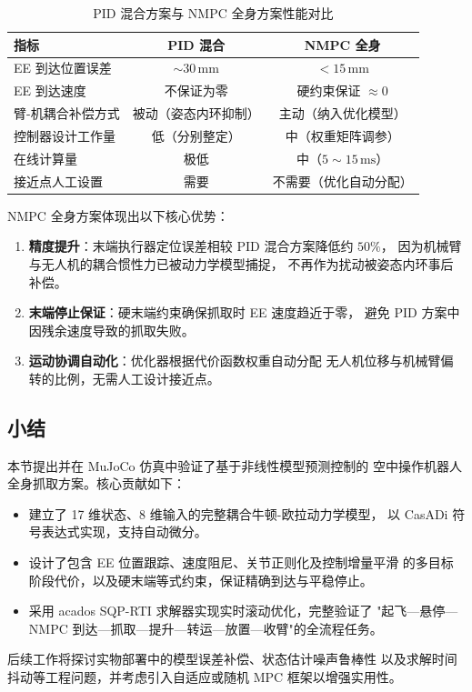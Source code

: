 \begin{table}[h]
\centering
\caption{PID 混合方案与 NMPC 全身方案性能对比}
\label{tab:pid_vs_mpc}
\begin{tabular}{lcc}
\hline
\textbf{指标} & \textbf{PID 混合} & \textbf{NMPC 全身} \\
\hline
EE 到达位置误差         & $\sim\!30\,\mathrm{mm}$       & $<15\,\mathrm{mm}$ \\
EE 到达速度             & 不保证为零                    & 硬约束保证 $\approx 0$ \\
臂-机耦合补偿方式       & 被动（姿态内环抑制）           & 主动（纳入优化模型） \\
控制器设计工作量         & 低（分别整定）                 & 中（权重矩阵调参） \\
在线计算量               & 极低                          & 中（$5\sim15\,\mathrm{ms}$） \\
接近点人工设置           & 需要                          & 不需要（优化自动分配）\\
\hline
\end{tabular}
\end{table}

NMPC 全身方案体现出以下核心优势：
\begin{enumerate}
    \item \textbf{精度提升}：末端执行器定位误差相较 PID 混合方案降低约 $50\%$，
          因为机械臂与无人机的耦合惯性力已被动力学模型捕捉，
          不再作为扰动被姿态内环事后补偿。
    \item \textbf{末端停止保证}：硬末端约束确保抓取时 EE 速度趋近于零，
          避免 PID 方案中因残余速度导致的抓取失败。
    \item \textbf{运动协调自动化}：优化器根据代价函数权重自动分配
          无人机位移与机械臂偏转的比例，无需人工设计接近点。
\end{enumerate}

\subsection{小结}

本节提出并在 MuJoCo 仿真中验证了基于非线性模型预测控制的
空中操作机器人全身抓取方案。核心贡献如下：

\begin{itemize}
    \item 建立了 17 维状态、8 维输入的完整耦合牛顿-欧拉动力学模型，
          以 CasADi 符号表达式实现，支持自动微分。
    \item 设计了包含 EE 位置跟踪、速度阻尼、关节正则化及控制增量平滑
          的多目标阶段代价，以及硬末端等式约束，保证精确到达与平稳停止。
    \item 采用 acados SQP-RTI 求解器实现实时滚动优化，完整验证了
          "起飞—悬停—NMPC 到达—抓取—提升—转运—放置—收臂"的全流程任务。
\end{itemize}

后续工作将探讨实物部署中的模型误差补偿、状态估计噪声鲁棒性
以及求解时间抖动等工程问题，并考虑引入自适应或随机 MPC 框架以增强实用性。
